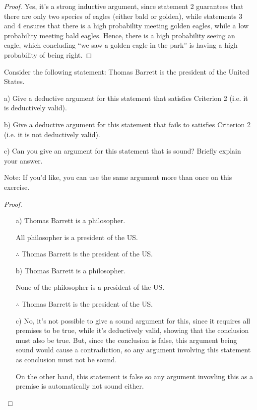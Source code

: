 \documentclass{article}
\begin{document}
\begin{proof}
    Yes, it's a strong inductive argument, since statement 2 guarantees that there are only two species of eagles (either bald or golden), while statements 3 and 4 ensures that there is a high probability meeting golden eagles, while a low probability meeting bald eagles. Hence, there is a high probability seeing an eagle, which concluding ``we saw a golden eagle in the park'' is having a high probability of being right.
\end{proof}

\newpage

\begin{ques}\label{q9}
Consider the following statement: Thomas Barrett is the president
of the United States.

a) Give a deductive argument for this statement that satisfies Criterion 2
(i.e. it is deductively valid).

b) Give a deductive argument for this statement that fails to satisfies Criterion 2 (i.e. it is not deductively valid).

c) Can you give an argument for this statement that is sound? Briefly explain
your answer.

Note: If you’d like, you can use the same argument more than once on this
exercise.
\end{ques}

\begin{proof}

    \hfil

    \begin{itemize}
        \item[a)] Thomas Barrett is a philosopher.
        
        All philosopher is a president of the US.

        $\therefore$ Thomas Barrett is the president of the US.
        \item[b)] Thomas Barrett is a philosopher.
        
        None of the philosopher is a president of the US.

        $\therefore$ Thomas Barrett is the president of the US.
        \item[c)]  No, it's not possible to give a sound argument for this, since it requires all premises to be true, while it's deductively valid, showing that the conclusion must also be true. But, since the conclusion is false, this argument being sound would cause a contradiction, so any argument involving this statement as conclusion must not be sound.
        
        On the other hand, this statement is false so any argument invovling this as a premise is automatically not sound either.
    \end{itemize}
\end{proof}
\end{document}

